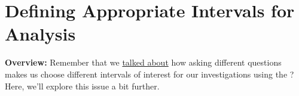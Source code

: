 
\section{Defining Appropriate Intervals for Analysis}
\label{act1.2.3}

\begin{overview}

\textbf{Overview:} Remember that we \hyperref[act1.2.2D]{talked about} how asking different questions makes us choose different intervals of interest for our investigations using the \EnergyInteractionModel? Here, we'll explore this issue a bit further.

\end{overview}

%
%	

	

	

